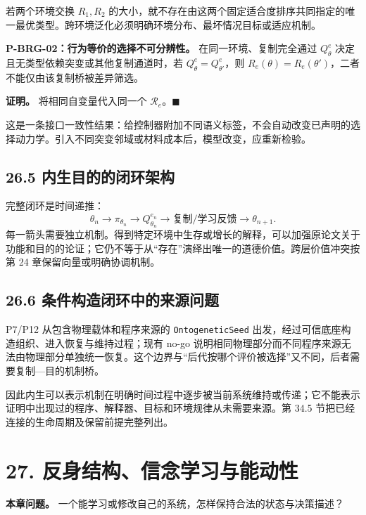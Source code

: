 \documentclass[
  11pt,
  oneside]{book}
\begin{document}
若两个环境交换 \(R_1,R_2\) 的大小，就不存在由这两个固定适合度排序共同指定的唯一最优类型。跨环境泛化必须明确环境分布、最坏情况目标或适应机制。

\hypertarget{p-brg-02}{}\label{p-brg-02}

\textbf{P-BRG-02：行为等价的选择不可分辨性。} 在同一环境、复制完全通过 \(Q_\theta^e\) 决定且无类型依赖突变或其他复制通道时，若 \(Q_\theta^e=Q_{\theta'}^e\)，则 \(R_e(\theta)=R_e(\theta')\)，二者不能仅由该复制桥被差异筛选。

\textbf{证明。} 将相同自变量代入同一个 \(\mathcal R_e\)。\(\blacksquare\)

这是一条接口一致性结果：给控制器附加不同语义标签，不会自动改变已声明的选择动力学。引入不同突变邻域或材料成本后，模型改变，应重新检验。

\section{26.5 内生目的的闭环架构}\label{ux5185ux751fux76eeux7684ux7684ux95edux73afux67b6ux6784}

完整闭环是时间递推： \[\theta_n \to \pi_{\theta_n}\to Q_{\theta_n}^{e_n}
\to\text{复制/学习反馈}\to\theta_{n+1}.\] 每一箭头需要独立机制。得到特定环境中生存或增长的解释，可以加强原论文关于功能和目的的论证；它仍不等于从``存在''演绎出唯一的道德价值。跨层价值冲突按第 24 章保留向量或明确协调机制。

\section{26.6 条件构造闭环中的来源问题}\label{ux6761ux4ef6ux6784ux9020ux95edux73afux4e2dux7684ux6765ux6e90ux95eeux9898}

P7/P12 从包含物理载体和程序来源的 \nolinkurl{OntogeneticSeed} 出发，经过可信底座构造组织、进入恢复与维持过程；现有 no-go 说明相同物理部分而不同程序来源无法由物理部分单独统一恢复。这个边界与``后代按哪个评价被选择''又不同，后者需要复制---目的机制桥。

因此内生可以表示机制在明确时间过程中逐步被当前系统维持或传递；它不能表示证明中出现过的程序、解释器、目标和环境规律从未需要来源。第 34.5 节把已经连接的生命周期及保留前提完整列出。

\chapter{27. 反身结构、信念学习与能动性}\label{ch-27}

\textbf{本章问题。} 一个能学习或修改自己的系统，怎样保持合法的状态与决策描述？
\end{document}
